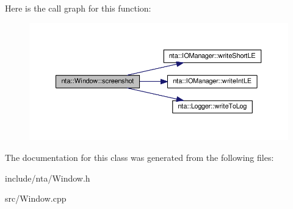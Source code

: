Here is the call graph for this function\+:
\nopagebreak
\begin{figure}[H]
\begin{center}
\leavevmode
\includegraphics[width=350pt]{d4/dfb/classnta_1_1Window_aa144f6bb014aaad3c91c3f3e6ad56f9c_cgraph}
\end{center}
\end{figure}


The documentation for this class was generated from the following files\+:\begin{DoxyCompactItemize}
\item 
include/nta/Window.\+h\item 
src/Window.\+cpp\end{DoxyCompactItemize}
